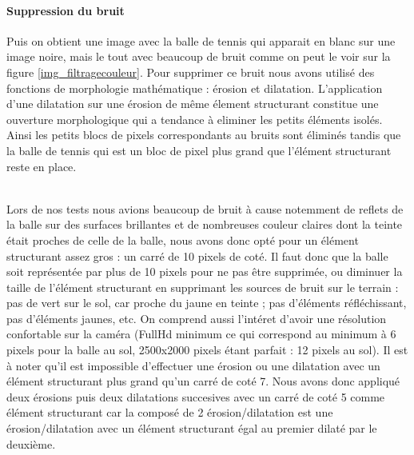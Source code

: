 \paragraph{Suppression du bruit\\}

Puis on obtient une image avec la balle de tennis qui apparait en blanc sur une image noire, mais le tout avec beaucoup de bruit comme on peut le voir sur la figure \ref{img_filtragecouleur}. Pour supprimer ce bruit nous avons utilisé des fonctions de morphologie mathématique : érosion et dilatation. L'application d'une dilatation sur une érosion de même élement structurant constitue une ouverture morphologique qui a tendance à eliminer les petits éléments isolés. Ainsi les petits blocs de pixels correspondants au bruits sont éliminés tandis que la balle de tennis qui est un bloc de pixel plus grand que l'élément structurant reste en place. \\ 

Lors de nos tests nous avions beaucoup de bruit à cause notemment de reflets de la balle sur des surfaces brillantes et de nombreuses couleur claires dont la teinte était proches de celle de la balle, nous avons donc opté pour un élément structurant assez gros : un carré de 10 pixels de coté. Il faut donc que la balle soit représentée par plus de 10 pixels pour ne pas être supprimée, ou diminuer la taille de l'élément structurant en supprimant les sources de bruit sur le terrain : pas de vert sur le sol, car proche du jaune en teinte ; pas d'éléments réfléchissant, pas d'éléments jaunes, etc. On comprend aussi l'intéret d'avoir une résolution confortable sur la caméra (FullHd minimum ce qui correspond au minimum à 6 pixels pour la balle au sol, 2500x2000 pixels étant parfait : 12 pixels au sol). Il est à noter qu'il est impossible d'effectuer une érosion ou une dilatation avec un élément structurant plus grand qu'un carré de coté 7. Nous avons donc appliqué deux érosions puis deux dilatations succesives avec un carré de coté 5 comme élément structurant car la composé de 2 érosion/dilatation est une érosion/dilatation avec un élément structurant égal au premier dilaté par le deuxième.\\



